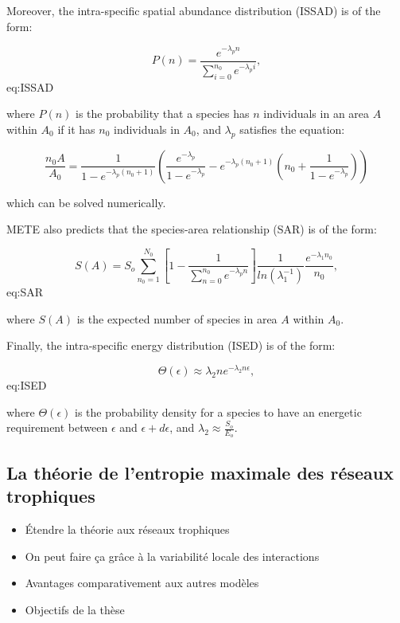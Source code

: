 Moreover, the intra-specific spatial abundance distribution (ISSAD) is of the
form:

$$P(n) = \frac{e^{-\lambda_pn}}{\sum_{i=0}^{n_0}e^{-\lambda_pi}},$${eq:ISSAD}

where $P(n)$ is the probability that a species has $n$ individuals in an area
$A$ within $A_0$ if it has $n_0$ individuals in $A_0$, and $\lambda_p$ satisfies
the equation:

$$\frac{n_0A}{A_0}=\frac{1}{1-e^{-\lambda_p(n_0+1)}}\left(\frac{e^{-\lambda_p}}{1-e^{-\lambda_p}}-e^{-\lambda_p(n_0+1)}\left(n_0+\frac{1}{1-e^{-\lambda_p}}\right)\right)$$

which can be solved numerically.

METE also predicts that the species-area relationship (SAR) is of the form:  

$$S(A) =
S_o\sum_{n_0=1}^{N_0}\left[1-\frac{1}{\sum_{n=0}^{n_0}e^{-\lambda_pn}}\right]\frac{1}{ln(\lambda_1^{-1})}\frac{e^{-\lambda_1n_0}}{n_0},$${eq:SAR}

where $S(A)$ is the expected number of species in area $A$ within  $A_0$.

Finally, the intra-specific energy distribution (ISED) is of the form:

$$\Theta(\epsilon)\approx \lambda_2ne^{-\lambda_2n\epsilon},$${eq:ISED}

where $\Theta(\epsilon)$ is the probability density for a species to have an
energetic requirement between $\epsilon$ and $\epsilon+d\epsilon$, and
$\lambda_2 \approx \frac{S_o}{E_o}$.

\subsection{La théorie de l'entropie maximale des réseaux trophiques} 

\begin{itemize}
    \item Étendre la théorie aux réseaux trophiques
    \item On peut faire ça grâce à la variabilité locale des interactions
    \item Avantages comparativement aux autres modèles
    \item Objectifs de la thèse
\end{itemize}

